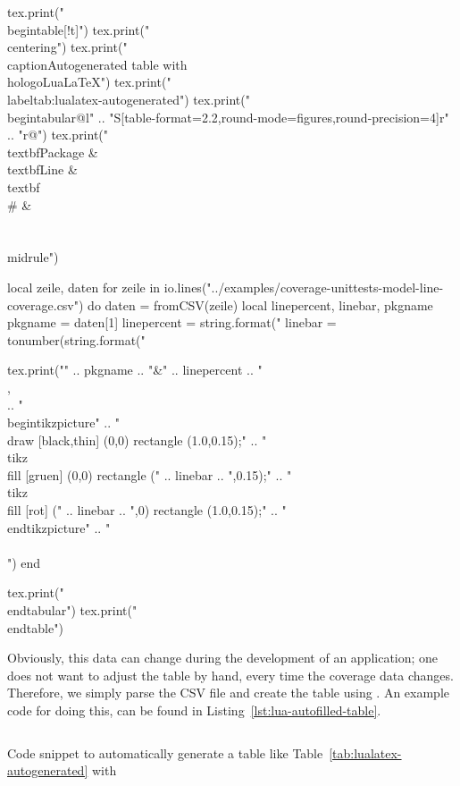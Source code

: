 \begin{luacode}
tex.print("\\begin{table}[!t]")
tex.print("\\centering")
tex.print("\\caption{Autogenerated table with \\hologo{LuaLaTeX}}")
tex.print("\\label{tab:lualatex-autogenerated}")
tex.print("\\begin{tabular}{@{}l"
  .. "S[table-format=2.2,round-mode=figures,round-precision=4]r"
  .. "r@{}}")
tex.print("\\textbf{Package} & \\textbf{Line} & \\textbf{\\#} & \\\\\\midrule")

local zeile, daten
for zeile in io.lines("../examples/coverage-unittests-model-line-coverage.csv") do
  daten = fromCSV(zeile)
  local linepercent, linebar, pkgname
  pkgname = daten[1]
  linepercent = string.format("%
  linebar = tonumber(string.format("%

  tex.print("" .. pkgname .. "&"
    .. linepercent .. "\\,\\%
    .. "\\begin{tikzpicture}"
    .. "\\draw [black,thin] (0,0) rectangle (1.0,0.15);"
    .. "\\tikz \\fill [gruen] (0,0) rectangle (" .. linebar .. ",0.15);"
    .. "\\tikz \\fill [rot] (" .. linebar .. ",0) rectangle (1.0,0.15);"
    .. "\\end{tikzpicture}"
    .. "\\\\")
end

tex.print("\\end{tabular}")
tex.print("\\end{table}")
\end{luacode}

Obviously, this data can change during the development of an application; one
does not want to adjust the table by hand, every time the coverage data changes.
Therefore, we simply parse the CSV file and create the table using
.  An example code for doing this, can be found in
Listing~\ref{lst:lua-autofilled-table}.

\begin{listing}[t]
  \inputminted[firstline=22,lastline=54]{latex}{../examples/lua-autofilled-table.tex}
  \caption{Code snippet to automatically generate a table like
    Table~\ref{tab:lualatex-autogenerated} with }
  \label{lst:lua-autofilled-table}
\end{listing}
